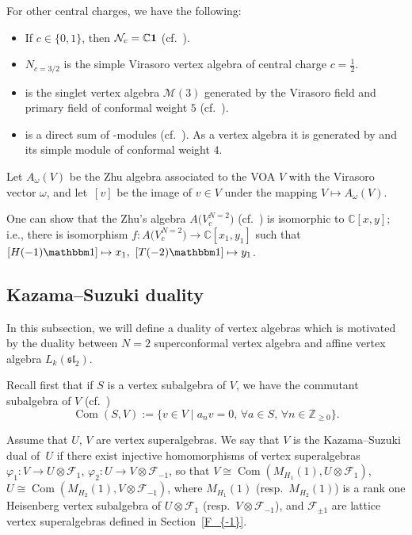 \documentclass[pdftex]{sigma}
\numberwithin{equation}{section}
\newcommand{\Z}{\mathbb Z}
\newcommand{\C}{\mathbb C}
\newcommand{\F}{\mathcal F}
\begin{document}
 For other central charges, we have the following:
\begin{itemize}\itemsep=0pt
\item If $c\in \{ 0, 1\}$, then $\mathcal N_c = {\C} {\bf 1}$ (cf.\ \cite{DLY}).
\item $N_{c=3/2}$ is the simple Virasoro vertex algebra of central charge $c=\frac{1}{2}$.
 \item {} is the singlet vertex algebra $\mathcal M(3)$ generated by the Virasoro field and primary field of conformal weight $5$ (cf.\ \cite{A-2005}).
 \item {} is a direct sum of -modules (cf.\ \cite{AMW}). As a vertex algebra it is generated by  and its simple module of conformal weight $4$.
\end{itemize}

 Let $A_{\omega}(V)$ be the Zhu algebra associated to the VOA $V$ with the Virasoro vector $\omega$, and let~$[v]$ be the image of $v \in V $ under the mapping $V \mapsto A_{\omega}(V)$.

 One can show that the Zhu's algebra $A\bigl(V^{N=2}_{c}\bigr)$ (cf.\ \cite{A-IMRN}) is isomorphic to ${\mathbb C}[x,y]$; i.e., there is isomorphism $f \colon A\bigl(V^{N=2}_{c}\bigr) \rightarrow {\mathbb C}[x_1,y_1]$ such that
$[H({-1}){\mathbbm 1}] \mapsto x_1, \ [T({-2}{)\mathbbm 1}] \mapsto y_1$.

\subsection{Kazama--Suzuki duality}
In this subsection, we will define a duality of vertex algebras which is motivated by the duality between $N=2$ superconformal vertex algebra and affine vertex algebra $L_k(\mathfrak{sl}_2)$.

Recall first that if $S$ is a vertex subalgebra of $V$, we have the commutant subalgebra of $V$ (cf.\ \cite{LL})
\[
\operatorname{Com} (S, V):= \{ v \in V \mid a_n v = 0,\, \forall a \in S,\, \forall n \in {\Z}_{\ge 0}\}.
\]

Assume that $U$, $V$ are vertex superalgebras. We say that $V$ is the Kazama--Suzuki dual of~$U$ if there exist injective homomorphisms of vertex superalgebras
$
 \varphi_1 \colon V \rightarrow U \otimes \F_1$, $ \varphi_2 \colon U \rightarrow V \otimes \F_{-1}$,
so that
$
V \cong \operatorname{Com} \left( M_{H_1} (1), U \otimes \F_1\right)$, $ U \cong \operatorname{Com} \left( M_{H_2} (1), V \otimes \F_{-1}\right)$,
where $M_{H_1} (1) $ (resp.\ $ M_{H_2} (1)$) is a rank one Heisenberg vertex subalgebra of
$U\otimes \F_1$ (resp.\ $V\otimes \F_{-1}$), and $\F_{\pm 1}$ are lattice vertex superalgebras defined in Section~\ref{F_{-1}}.
\end{document}

